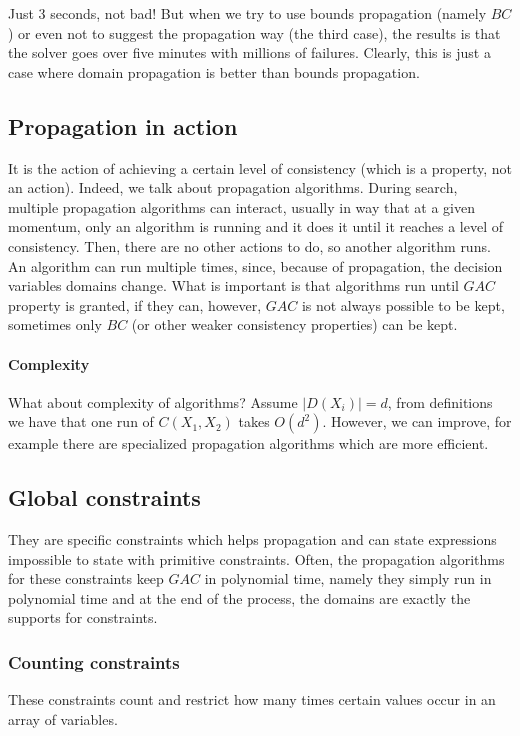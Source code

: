 \documentclass[10pt,a4paper]{article}
\begin{document}
Just 3 seconds, not bad! But when we try to use bounds propagation (namely $BC$)
or even not to suggest the propagation way (the third case), the results is that
the solver goes over five minutes with millions of failures. Clearly, this is
just a case where domain propagation is better than bounds propagation.

\subsection{Propagation in action}
It is the action of achieving a certain level of consistency (which is a
property, not an action). Indeed, we talk about propagation algorithms. During
search, multiple propagation algorithms can interact, usually in way that at a
given momentum, only an algorithm is running and it does it until it reaches a
level of consistency. Then, there are no other actions to do, so another
algorithm runs. An algorithm can run multiple times, since, because of
propagation, the decision variables domains change. What is important is that
algorithms run until $GAC$ property is granted, if they can, however, $GAC$ is
not always possible to be kept, sometimes only $BC$ (or other weaker consistency
properties) can be kept.

\paragraph{Complexity}
What about complexity of algorithms? Assume $ | D(X_i) | = d $, from definitions
we have that one run of $C(X_1, X_2)$ takes $ O(d^2) $. However, we can improve,
for example there are specialized propagation algorithms which are more
efficient.

\subsection{Global constraints}
They are specific constraints which helps propagation and can state expressions
impossible to state with primitive constraints. Often, the propagation
algorithms for these constraints keep $GAC$ in polynomial time, namely they
simply run in polynomial time and at the end of the process, the domains are
exactly the supports for constraints.

\subsubsection{Counting constraints}
These constraints count and restrict how many times certain values occur in an
array of variables.
\end{document}
